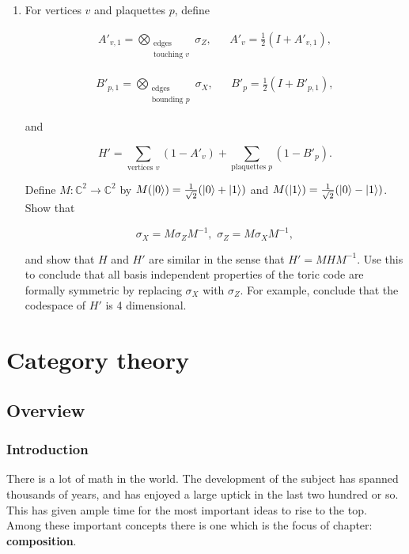 \documentclass{article}
\theoremstyle{definition}
\newcommand{\CC}{\mathbb{C}}
\newcommand{\0}{\left|0\right>}
\newcommand{\1}{\left|1\right>}
\numberwithin{figure}{section}
\begin{document}
\begin{enumerate}[\thesection .1.]

\item For vertices $v$ and plaquettes $p$, define

\begin{align*}
A'_{v,1}=\bigotimes_{\substack{\text{edges} \\ \text{touching }v}}\sigma_Z, && A'_v=\frac{1}{2}\left(I + A'_{v,1}\right),
\end{align*}

\begin{align*}
B'_{p,1}=\bigotimes_{\substack{\text{edges} \\ \text{bounding }p}}\sigma_X, && B'_p=\frac{1}{2}\left(I + B'_{p,1}\right),
\end{align*}

and

$$H'=\sum_{\text{vertices }v}(1-A'_v)+\sum_{\text{plaquettes }p}(1-B'_p).$$

Define $M:\CC^2\to \CC^2$ by $M(\ket{0})=\frac{1}{\sqrt{2}}(\ket{0}+\ket{1})$ and $M(\ket{1})=\frac{1}{\sqrt{2}}(\ket{0}-\ket{1})$. Show that

$$\sigma_X=M\sigma_ZM^{-1},\,\, \sigma_{Z}=M\sigma_X M^{-1},$$

and show that $H$ and $H'$ are similar in the sense that $H'=MHM^{-1}$. Use this to conclude that all basis independent properties of the toric code are formally symmetric by replacing $\sigma_X$ with $\sigma_Z$. For example, conclude that the codespace of $H'$ is 4 dimensional.

\end{enumerate}

\section{Category theory}

\subsection{Overview}

\subsubsection{Introduction}

There is a lot of math in the world. The development of the subject has spanned thousands of years, and has enjoyed a large uptick in the last two hundred or so. This has given ample time for the most important ideas to rise to the top. Among these important concepts there is one which is the focus of chapter: \textbf{composition}.
\end{document}
